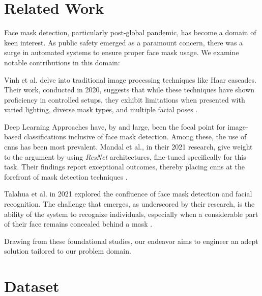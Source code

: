 \documentclass{article}
\begin{document}
\section{Related Work}
\label{relwork}

Face mask detection, particularly post-global pandemic, has become a domain of keen interest. As public safety emerged as a paramount concern, there was a surge in automated systems to ensure proper face mask usage. We examine notable contributions in this domain:

Vinh et al. delve into traditional image processing techniques like Haar cascades. Their work, conducted in 2020, suggests that while these techniques have shown proficiency in controlled setups, they exhibit limitations when presented with varied lighting, diverse mask types, and multiple facial poses \autocite{9353070}.

Deep Learning Approaches have, by and large, been the focal point for image-based classifications inclusive of face mask detection. Among these, the use of \Glspl{cnn} has been most prevalent. Mandal et al., in their 2021 research, give weight to the argument by using \textit{ResNet} architectures, fine-tuned specifically for this task. Their findings report exceptional outcomes, thereby placing \Glspl{cnn} at the forefront of mask detection techniques \autocite{mandal2021masked}.

Talahua et al. in 2021 explored the confluence of face mask detection and facial recognition. The challenge that emerges, as underscored by their research, is the ability of the system to recognize individuals, especially when a considerable part of their face remains concealed behind a mask \autocite{su13126900}.


Drawing from these foundational studies, our endeavor aims to engineer an adept solution tailored to our problem domain.

\section{Dataset}
\label{dataset}
\end{document}
